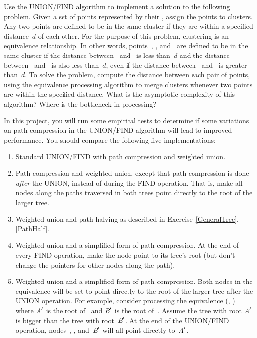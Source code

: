 \begin{projects}
\item
\label{ClusterProb}
Use the UNION/FIND algorithm to implement a solution to the
following problem.
Given a set of points represented by their \XYcoords, assign the
points to clusters.
Any two points are defined to be in the same cluster if they are
within a specified distance~\(d\) of each other.
For the purpose of this problem, clustering is an equivalence
relationship.
In other words, points~, , and~ are defined to
be in the same cluster if the distance between~ and~
is less than~\(d\) and the distance between~ and~ is
also less than~\(d\), even if the distance between~ and~
is greater than~\(d\).
To solve the problem, compute the distance between each pair of
points, using the equivalence processing algorithm to merge clusters
whenever two points are within the specified distance.
What is the asymptotic complexity of this algorithm?
Where is the bottleneck in processing?

\item
In this project, you will run some empirical tests to determine if
some variations on path compression in the UNION/FIND algorithm will
lead to improved performance.
You should compare the following five implementations:
\begin{enumerate}
\item Standard UNION/FIND with path compression and weighted union.
\item Path compression and weighted union, except that path
compression is done \emph{after} the UNION, instead of during the FIND 
operation.
That is, make all nodes along the paths traversed in both trees point
directly to the root of the larger tree.
\item Weighted union and path halving as described in
Exercise~\ref{GeneralTree}.\ref{PathHalf}.
\item Weighted union and a simplified form of path compression.
At the end of every FIND operation, make the node point to its
tree's root (but don't change the pointers for other nodes along the
path).
\item Weighted union and a simplified form of path compression.
Both nodes in the equivalence will be set to point directly to the
root of the larger tree after the UNION operation.
For example, consider processing the equivalence (, ) where
\({\textit{A}}'\) is the root of~ and \({\textit{B}}'\) is the root
of~.
Assume the tree with root \({\textit{A}}'\) is bigger than the tree
with root~\({\textit{B}}'\).
At the end of the UNION/FIND operation, nodes~, ,
and~\({\textit{B}}'\) will all point directly to~\({\textit{A}}'\).
\end{enumerate}

\end{projects}
